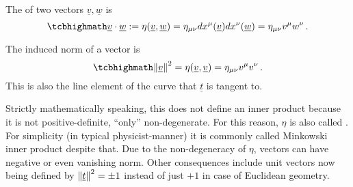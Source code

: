 \documentclass[../relativity_main.tex]{subfiles}
\begin{document}
\begin{defi}
The  of two vectors $\underline{v}, \underline{w}$ is
\begin{equation}\label{eq:inner_prod}
	\eqbox{
	\underline{v} \cdot \underline{w} := \eta(\underline{v}, \underline{w}) = \eta_{\mu \nu} dx^\mu(\underline{v}) dx^\nu(\underline{w}) = \eta_{\mu \nu} v^\mu w^\nu
	} \, .
\end{equation}

The induced norm of a vector is
\begin{equation}\label{eq:vector_norm}
	\eqbox{
	\norm{\underline{v}}^2 = \eta(\underline{v}, \underline{v}) = \eta_{\mu \nu} v^\mu v^\nu
	} \, .
\end{equation}
This is also the line element of the curve that $\underline{t}$ is tangent to.
\iffalse
Based on that, a general way to define the distance between events $E_1$ at $\underline{x_1} = (ct_1, x_1, y_1, z_1)$ and $E_2$ at $\underline{x_2} = (ct_2, x_2, y_2, z_2)$ in an inertial Cartesian frame is
\begin{equation}
	\eqbox{
	\begin{split}
	d(E_1, E_2) &= \sqrt{(x_2 - x_1)^2 + (y_2 - y_1)^2 + (z_2 - z_1)^2 - c^2 (t_2 - t_1)^2}
	\\
	&= c \, \sqrt{- \tau_{E_1, E_2}^2} = \eta_{\mu \nu} (x_1^\mu - x_2^\mu) (x_1^\nu - x_2^\nu)
	\\
	&= \min_{\Gamma: \; \Gamma(a) = E_1, \Gamma(b) = E_2} L(\Gamma)
	= \min_{\Gamma: \; \Gamma(a) = E_1, \Gamma(b) = E_2} \int_\Gamma ds
	\end{split}
	}
\end{equation}
i.e.~as the (proper) length of the straight world line connecting them.
\fi
\end{defi}
Strictly mathematically speaking, this does not define an inner product because it is not positive-definite, \enquote{only} non-degenerate. For this reason, $\eta$ is also called . For simplicity (in typical physicist-manner) it is commonly called Minkowski inner product despite that. Due to the non-degeneracy of $\eta$, vectors can have negative or even vanishing norm. Other consequences include unit vectors now being defined by $\norm{\underline{t}}^2 = \pm 1$ instead of just $+ 1$ in case of Euclidean geometry.
\end{document}
